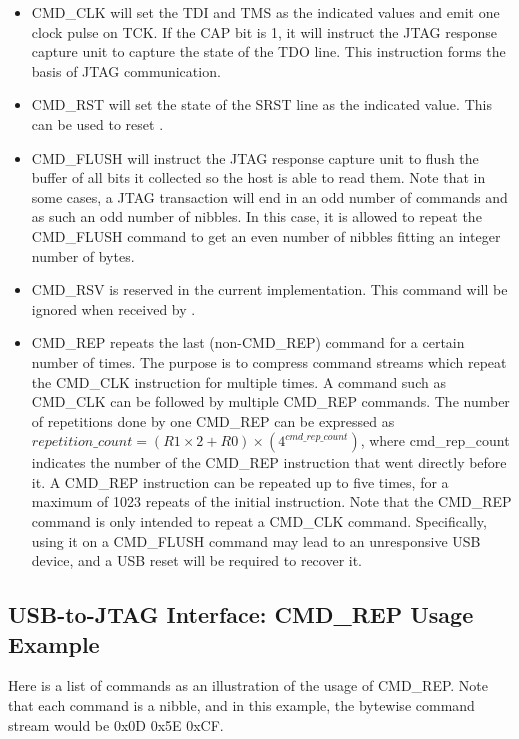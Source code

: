 \documentclass[main\_\_EN.tex]{subfiles}
\begin{document}
\begin{itemize}
\item CMD\_CLK will set the TDI and TMS as the indicated values and emit one clock pulse on TCK. If the CAP bit is 1, it will instruct the JTAG response capture unit to capture the state of the TDO line. This instruction forms the basis of JTAG communication.

\item CMD\_RST will set the state of the SRST line as the indicated value. This can be used to reset \chipname{}.

\item CMD\_FLUSH will instruct the JTAG response capture unit to flush the buffer of all bits it collected so the host is able to read them. Note that in some cases, a JTAG transaction will end in an odd number of commands and as such an odd number of nibbles. In this case, it is allowed to repeat the CMD\_FLUSH command to get an even number of nibbles fitting an integer number of bytes.

\item CMD\_RSV is reserved in the current implementation. This command will be ignored when received by \chipname{}.

\item CMD\_REP repeats the last (non-CMD\_REP) command for a certain number of times. The purpose is to compress command streams which repeat the CMD\_CLK instruction for multiple times. A command such as CMD\_CLK can be followed by multiple CMD\_REP commands. The number of repetitions done by one CMD\_REP can be expressed as \begin{math}repetition\_count = (R1 \times 2 + R0) \times (4^{cmd\_rep\_count})\end{math}, where cmd\_rep\_count indicates the number of the CMD\_REP instruction that went directly before it. A CMD\_REP instruction can be repeated up to five times, for a maximum of 1023 repeats of the initial instruction. Note that the CMD\_REP command is only intended to repeat a CMD\_CLK command. Specifically, using it on a CMD\_FLUSH command may lead to an unresponsive USB device, and a USB reset will be required to recover it.
\end{itemize}

\subsection{USB-to-JTAG Interface: CMD\_REP Usage Example}


Here is a list of commands as an illustration of the usage of CMD\_REP.
Note that each command is a nibble, and in this example, the bytewise command stream would be 0x0D 0x5E 0xCF.
\end{document}
